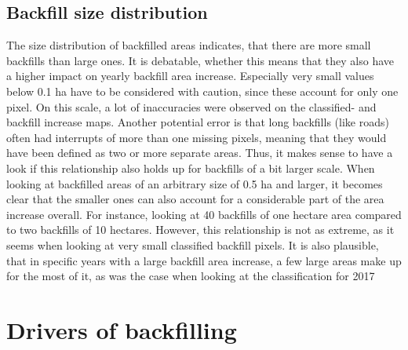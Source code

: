 \documentclass[11pt, A4, oneside]{report}
\begin{document}




\subsection{Backfill size distribution}
The size distribution of backfilled areas indicates, that there are more small backfills than large ones.  It is debatable, whether this means that they also have a higher impact on yearly backfill area increase. Especially very small values below 0.1 ha have to be considered with caution, since these account for only one pixel. On this scale, a lot of inaccuracies were observed on the classified- and backfill increase maps. Another potential error is that long backfills (like roads) often had interrupts of more than one missing pixels, meaning that they would have been defined as two or more separate areas. Thus, it makes sense to have a look if this relationship also holds up for backfills of a bit larger scale. When looking at backfilled areas of an arbitrary size of 0.5 ha and larger, it becomes clear that the smaller ones can also account for a considerable part of the area increase overall. For instance, looking at 40 backfills of one hectare area compared to two backfills of 10 hectares. However, this relationship is not as extreme, as it seems when looking at very small classified backfill pixels. It is also plausible, that in specific years with a large backfill area increase, a few large areas make up for the most of it, as was the case when looking at the classification for 2017


\section{Drivers of backfilling} 
\end{document}
